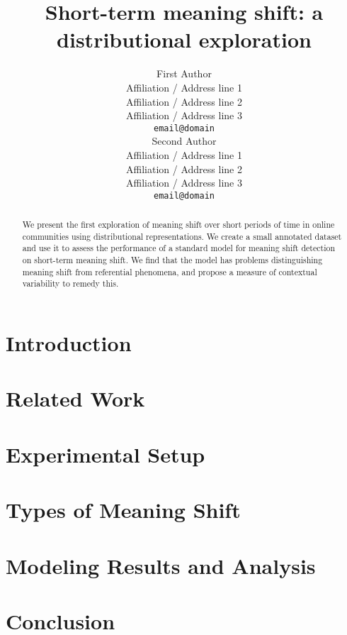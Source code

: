 \documentclass[11pt,a4paper]{article}
\title{Short-term meaning shift: a distributional exploration}
\author{First Author \\
  Affiliation / Address line 1 \\
  Affiliation / Address line 2 \\
  Affiliation / Address line 3 \\
  {\tt email@domain} \\\And
  Second Author \\
  Affiliation / Address line 1 \\
  Affiliation / Address line 2 \\
  Affiliation / Address line 3 \\
  {\tt email@domain} \\}
\date{}
\begin{document}
\maketitle
\begin{abstract}
We present the first exploration of meaning shift over short periods of time in online communities using distributional representations. We create a small annotated dataset and use it to assess the performance of a standard model for meaning shift detection on short-term meaning shift. We find that the model has problems distinguishing meaning shift from referential phenomena, and propose a measure of contextual variability to remedy this.
\end{abstract}

\section{Introduction}
\label{sect:Introduction}


 
\section{Related Work}
\label{sect:Related_Work}



\section{Experimental Setup}
\label{sec:setup}



\section{Types of Meaning Shift}
\label{sec:types}



\section{Modeling Results and Analysis}
\label{sect:results}



\section{Conclusion}
\label{sect:conc}






\end{document}

